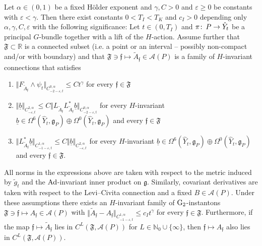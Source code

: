 \documentclass[11pt,a4paper]{scrartcl}
\newcommand{\col}{\colon \thinspace}
\newcommand{\Ad}{\textup{Ad}}
\newcommand{\VertWHt}[3]{\Vert_{C^{{#1},\alpha}_{{#2},t}{#3}}}
\newcommand{\G}{\textup{G}}
\numberwithin{equation}{section}
\theoremstyle{plain}
\theoremstyle{definition}
\theoremstyle{remark}
\begin{document}
\begin{theorem}\label{theo:perturbing_almost_instantons}
Let $\alpha \in (0,1)$ be a fixed Hölder exponent and $\gamma,C>0$ and $\varepsilon\geq 0$ be constants with $\varepsilon<\gamma$. Then there exist constants $0<T_I<T_K$ and $c_I>0$ depending only $\alpha,\gamma,C,\varepsilon$ with the following significance: Let $t\in (0,T_I)$ and $\pi \col P \to \hat{Y}_t$ be a principal $G$-bundle together with a lift of the $H$-action. Assume further that $\mathfrak{F} \subset \mathbb{R}$ is a connected subset (i.e. a point or an interval -- possibly non-compact and/or with boundary) and that $\mathfrak{F}\ni \mathfrak{f}\mapsto \tilde{A}_{\mathfrak{f}}\in \mathcal{A}(P)$ is a family of $H$-invariant connections that satisfies 
\begin{enumerate}
\item \label{bul:pregluing-error} $\Vert F_{\tilde{A}_{\mathfrak{f}}} \wedge \psi_t \VertWHt{0}{-2-\varepsilon}{} \leq C t^{\gamma}$ for every $\mathfrak{f} \in \mathfrak{F}$
\item \label{bul:linearEstimate} $\Vert \underline{b} \VertWHt{2}{-\varepsilon}{} \leq C \Vert L_{\tilde{A}_{\mathfrak{f}}}L_{\tilde{A}_{\mathfrak{f}}}^* \underline{b} \VertWHt{0}{-2-\varepsilon}{}$ for every $H$-invariant $\underline{b}\in \Omega^6(\hat{Y}_t,\mathfrak{g}_P) \oplus \Omega^0(\hat{Y}_t,\mathfrak{g}_P)$ and every $\mathfrak{f}\in \mathfrak{F}$
\item \label{bul: operator norm estimate on L_A^*} $\Vert L_{\tilde{A}_{\mathfrak{f}}}^* \underline{b} \VertWHt{1}{-1-\varepsilon}{} \leq C \Vert  \underline{b} \VertWHt{2}{-\varepsilon}{}$  for every $H$-invariant $\underline{b}\in \Omega^6(\hat{Y}_t,\mathfrak{g}_P) \oplus \Omega^0(\hat{Y}_t,\mathfrak{g}_P)$ and every $\mathfrak{f}\in \mathfrak{F}$.
\end{enumerate}
All norms in the expressions above are taken with respect to the metric induced by $\tilde{g}_t$ and the $\Ad$-invariant inner product on $\mathfrak{g}$. Similarly, covariant derivatives are taken with respect to the Levi--Civita connection and a fixed $B\in \mathcal{A}(P)$. Under these assumptions there exists an $H$-invariant family of $\G_2$-instantons $\mathfrak{F}\ni \mathfrak{f} \mapsto A_{\mathfrak{f}}\in \mathcal{A}(P)$ with $\Vert \tilde{A}_{\mathfrak{f}}-A_{\mathfrak{f}} \VertWHt{1}{-1-\varepsilon}{} \leq c_I t^{\gamma}$ for every $\mathfrak{f} \in \mathfrak{F}$. Furthermore, if the map $\mathfrak{f} \mapsto \tilde{A}_{\mathfrak{f}}$ lies in $C^{L}(\mathfrak{F}, \mathcal{A}(P))$ for $L \in \mathbb{N}_0 \cup \{\infty\}$, then $\mathfrak{f} \mapsto A_{\mathfrak{f}}$ also lies in $C^{L}(\mathfrak{F}, \mathcal{A}(P))$.
\end{theorem}
\end{document}
